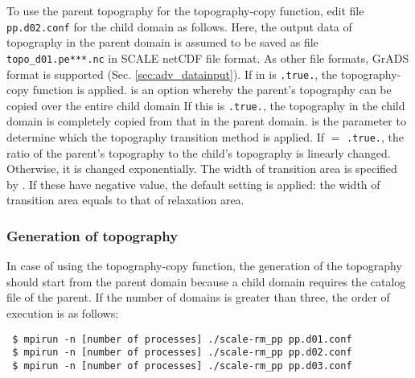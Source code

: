 To use the parent topography for the topography-copy function, edit file \verb|pp.d02.conf| for the child domain as follows.
Here, the output data of topography in the parent domain is assumed to be saved as file \verb|topo_d01.pe***.nc| in SCALE netCDF file format.
As other file formats, GrADS format is supported (Sec. \ref{sec:adv_datainput}).
If  in  is \verb|.true.|, the topography-copy function is applied.
 is an option whereby the parent’s topography can be copied over the entire child domain
If this is \verb|.true.|, the topography in the child domain is completely copied from that in the parent domain.
 is the parameter to determine which the topography transition method is applied. If  $=$ \verb|.true.|, the ratio of the parent’s topography to the child’s topography is linearly changed. Otherwise, it is changed exponentially.
The width of transition area is specified by . If these have negative value, the default setting is applied: the width of transition area equals to that of relaxation area.


\subsubsection{Generation of topography}
In case of using the topography-copy function, the generation of the topography should start from the parent domain  because a child domain requires the catalog  file of the parent. If the number of domains is greater than three, the order of execution is as follows:
\begin{verbatim}
 $ mpirun -n [number of processes] ./scale-rm_pp pp.d01.conf
 $ mpirun -n [number of processes] ./scale-rm_pp pp.d02.conf
 $ mpirun -n [number of processes] ./scale-rm_pp pp.d03.conf
\end{verbatim}


